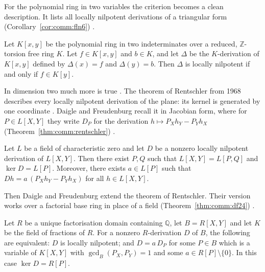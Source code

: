 For the polynomial ring in two variables the criterion becomes a clean
description. It lists all locally nilpotent derivations of a triangular form (Corollary~\ref{cor:comm:fln6})
\cite[Corollary~6, p.~49]{FerreroLequainNowicki1992}.\begin{corollary}\label{cor:comm:fln6}
Let $K[x, y]$ be the polynomial ring in two indeterminates over a reduced,
$\mathbb{Z}$-torsion free ring $K$. Let $f \in K[x, y]$ and $b \in K$, and
let $\Delta$ be the $K$-derivation of $K[x, y]$ defined by $\Delta(x) = f$
and $\Delta(y) = b$. Then $\Delta$ is locally nilpotent if and only if
$f \in K[y]$.
\end{corollary}

In dimension two much more is true
\cite[pp.~356--357]{DaigleFreudenburg1998UFD}. The theorem of Rentschler from
1968 describes every locally nilpotent derivation of the plane: its kernel is
generated by one coordinate
\cite[pp.~356--357]{DaigleFreudenburg1998UFD}. Daigle and Freudenburg recall
it in Jacobian form, where for $P\in L[X,Y]$ they write $D_P$ for the
derivation $h \mapsto P_X h_Y - P_Y h_X$ (Theorem~\ref{thm:comm:rentschler})
\cite[pp.~356--357]{DaigleFreudenburg1998UFD}.\begin{theorem}\label{thm:comm:rentschler}
Let $L$ be a field of characteristic zero and let $D$ be a nonzero locally
nilpotent derivation of $L[X, Y]$. Then there exist $P, Q$ such that
$L[X, Y] = L[P, Q]$ and $\ker D = L[P]$. Moreover, there exists $a\in L[P]$
such that $D h = a\,(P_X h_Y - P_Y h_X)$ for all $h \in L[X, Y]$.
\end{theorem}

Then Daigle and Freudenburg extend the theorem of Rentschler. Their version
works over a factorial base ring in place of a field (Theorem~\ref{thm:comm:df24})
\cite[Theorem~2.4, pp.~358--359]{DaigleFreudenburg1998UFD}.\begin{theorem}\label{thm:comm:df24}
Let $R$ be a unique factorisation domain containing $\mathbb{Q}$, let
$B = R[X, Y]$ and let $K$ be the field of fractions of $R$. For a nonzero
$R$-derivation $D$ of $B$, the following are equivalent: $D$ is locally
nilpotent; and $D = a\,D_P$ for some $P \in B$ which is a variable of
$K[X, Y]$ with $\gcd_B(P_X, P_Y) = 1$ and some
$a \in R[P]\setminus\{0\}$. In this case $\ker D = R[P]$.
\end{theorem}

